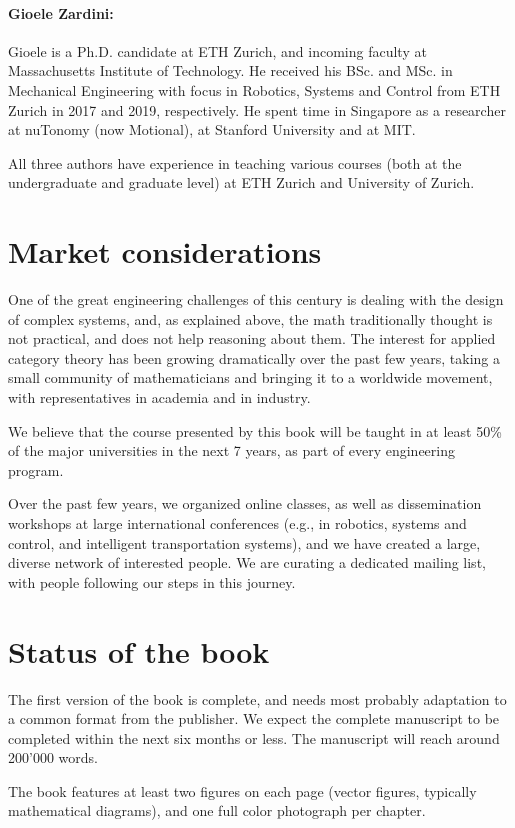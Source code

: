 \documentclass[10pt, article, one side]{memoir}
\begin{document}
    \paragraph*{Gioele Zardini:}
    Gioele is a Ph.D.
    candidate at ETH Zurich, and incoming faculty at Massachusetts Institute of Technology.
    He received his BSc.
    and MSc. in Mechanical Engineering with focus in Robotics, Systems and Control from ETH Zurich in 2017 and 2019, respectively.
    He spent time in Singapore as a researcher at nuTonomy (now Motional), at Stanford University and at MIT.

    All three authors have experience in teaching various courses (both at the undergraduate and graduate level) at ETH Zurich and University of Zurich.
    \section{Market considerations}
    One of the great engineering challenges of this century is dealing with the design of complex systems, and, as explained above, the math traditionally thought is not practical, and does not help reasoning about them.
    The interest for applied category theory has been growing dramatically over the past few years, taking a small community of mathematicians and bringing it to a worldwide movement, with representatives in academia and in industry.

    We believe that the course presented by this book will be taught in at least 50\% of the major universities in the next 7 years, as part of every engineering program.

    Over the past few years, we organized online classes, as well as dissemination workshops at large international conferences (e.g., in robotics, systems and control, and intelligent transportation systems), and we have created a large, diverse network of interested people.
    We are curating a dedicated mailing list, with people following our steps in this journey.

    \section{Status of the book}
    The first version of the book is complete, and needs most probably adaptation to a common format from the publisher.
    We expect the complete manuscript to be completed within the next six months or less.
    The manuscript will reach around 200’000 words.

    The book features at least two figures on each page (vector figures, typically mathematical diagrams), and one full color photograph per chapter.
\end{document}
